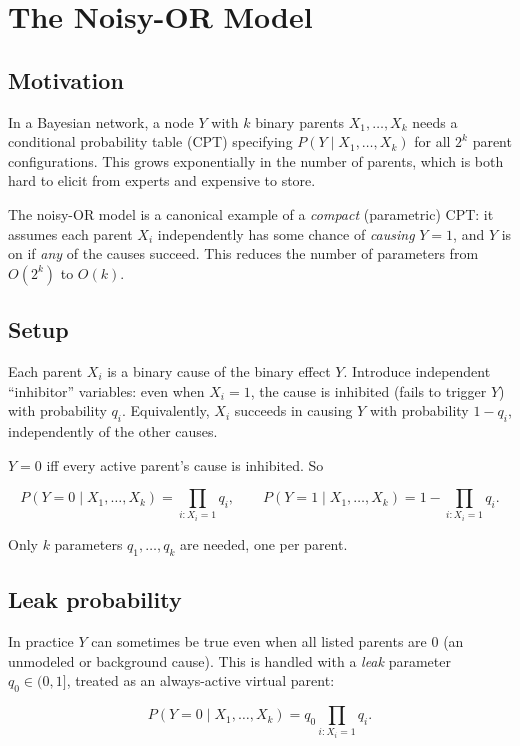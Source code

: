 \documentclass[11pt]{article}
\begin{document}
\section{The Noisy-OR Model}

\subsection{Motivation}

In a Bayesian network, a node $Y$ with $k$ binary parents $X_1, \dots, X_k$ needs a
conditional probability table (CPT) specifying $P(Y \mid X_1, \dots, X_k)$ for all
$2^k$ parent configurations. This grows exponentially in the number of parents,
which is both hard to elicit from experts and expensive to store.

The noisy-OR model is a canonical example of a \emph{compact} (parametric) CPT: it
assumes each parent $X_i$ independently has some chance of \emph{causing} $Y=1$,
and $Y$ is on if \emph{any} of the causes succeed. This reduces the number of
parameters from $O(2^k)$ to $O(k)$.

\subsection{Setup}

Each parent $X_i$ is a binary cause of the binary effect $Y$. Introduce independent
``inhibitor'' variables: even when $X_i = 1$, the cause is inhibited (fails to
trigger $Y$) with probability $q_i$. Equivalently, $X_i$ succeeds in causing $Y$
with probability $1 - q_i$, independently of the other causes.

$Y = 0$ iff every active parent's cause is inhibited. So

\[
P(Y = 0 \mid X_1, \dots, X_k) = \prod_{i : X_i = 1} q_i,
\qquad
P(Y = 1 \mid X_1, \dots, X_k) = 1 - \prod_{i : X_i = 1} q_i .
\]

Only $k$ parameters $q_1, \dots, q_k$ are needed, one per parent.

\subsection{Leak probability}

In practice $Y$ can sometimes be true even when all listed parents are 0 (an
unmodeled or background cause). This is handled with a \emph{leak} parameter
$q_0 \in (0,1]$, treated as an always-active virtual parent:

\[
P(Y = 0 \mid X_1, \dots, X_k) = q_0 \prod_{i : X_i = 1} q_i .
\]
\end{document}
